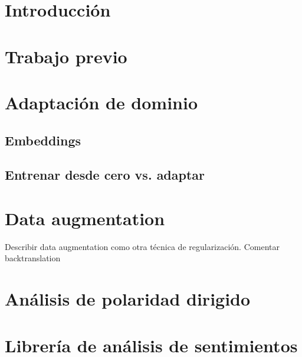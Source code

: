 
\section{Introducción}

\section{Trabajo previo}

\section{Adaptación de dominio}

\subsection{Embeddings}
\subsection{Entrenar desde cero vs. adaptar}

\section{Data augmentation}

Describir data augmentation como otra técnica de regularización. Comentar backtranslation

\section{Análisis de polaridad dirigido}
\section{Librería de análisis de sentimientos}